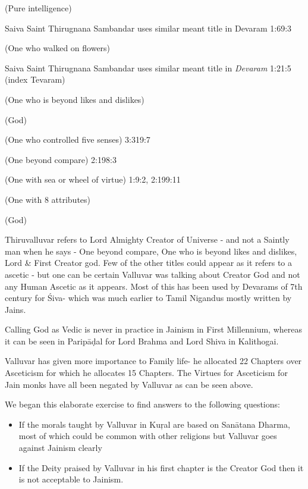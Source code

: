  (Pure intelligence)

Saiva Saint Thirugnana Sambandar uses similar meant title in Devaram 1:69:3

 (One who walked on flowers)

Saiva Saint Thirugnana Sambandar uses similar meant title in \textit{Devaram} 1:21:5 (index Tevaram)

 (One who is beyond likes and dislikes)

 (God)

 (One who controlled five senses) 3:319:7

 (One beyond compare) 2:198:3

 (One with sea or wheel of virtue) 1:9:2, 2:199:11

 (One with 8 attributes)

 (God)

Thiruvalluvar refers to Lord Almighty Creator of Universe - and not a Saintly man when he says - One beyond compare, One who is beyond likes and dislikes, Lord \& First Creator god. Few of the other titles could appear as it refers to a ascetic - but one can be certain Valluvar was talking about Creator God and not any Human Ascetic as it appears. Most of this has been used by Devarams of 7th century for Śiva- which was much earlier to Tamil Nigandus mostly written by Jains.

Calling God as Vedic is never in practice in Jainism in First Millennium, whereas it can be seen in Paripāḍal for Lord Brahma and\endnote{} Lord Shiva in Kalithogai.

Valluvar has given more importance to Family life- he allocated 22 Chapters over Asceticism for which he allocates 15 Chapters. The Virtues for Asceticism for Jain monks have all been negated by Valluvar as can be seen above.

We began this elaborate exercise to find answers to the following questions:

\begin{itemize}
\item If the morals taught by Valluvar in Kuŗal are based on Sanātana Dharma, most of which could be common with other religions but Valluvar goes against Jainism clearly

 \item If the Deity praised by Valluvar in his first chapter is the Creator God then it is not acceptable to Jainism.

\end{itemize}

